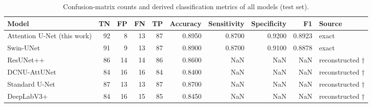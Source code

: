 \begin{table}
\caption{Confusion-matrix counts and derived classification metrics of all models (test set).}
\label{tab:confusion_counts}
\begin{tabular}{lrrrrrrrrl}
\toprule
Model & TN & FP & FN & TP & Accuracy & Sensitivity & Specificity & F1 & Source \\
\midrule
Attention U-Net (this work) & 92 & 8 & 13 & 87 & 0.8950 & 0.8700 & 0.9200 & 0.8923 & exact \\
Swin-UNet & 91 & 9 & 13 & 87 & 0.8900 & 0.8700 & 0.9100 & 0.8878 & exact \\
ResUNet++ & 86 & 14 & 14 & 86 & 0.8600 & NaN & NaN & NaN & reconstructed † \\
DCNU-AttUNet & 84 & 16 & 16 & 84 & 0.8400 & NaN & NaN & NaN & reconstructed † \\
Standard U-Net & 87 & 13 & 13 & 87 & 0.8700 & NaN & NaN & NaN & reconstructed † \\
DeepLabV3+ & 84 & 16 & 15 & 85 & 0.8450 & NaN & NaN & NaN & reconstructed † \\
\bottomrule
\end{tabular}
\end{table}

